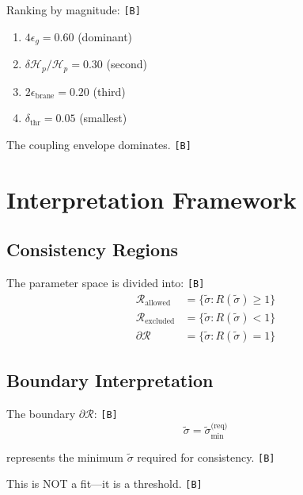 \documentclass[11pt,a4paper]{article}
\newcommand{\tagB}{\textcolor{purple!70!black}{\texttt{[B]}}}
\theoremstyle{definition}
\begin{document}
Ranking by magnitude: \tagB{}
\begin{enumerate}
  \item $4\epsilon_g = 0.60$ (dominant)
  \item $\delta\mathcal{H}_p/\mathcal{H}_p = 0.30$ (second)
  \item $2\epsilon_{\text{brane}} = 0.20$ (third)
  \item $\delta_{\text{thr}} = 0.05$ (smallest)
\end{enumerate}

The coupling envelope dominates. \tagB{}

\section{Interpretation Framework}
\label{sec:interpretation}

\subsection{Consistency Regions}
\label{subsec:regions}

The parameter space is divided into: \tagB{}
\begin{align}
\label{eq:region-allowed}
\mathcal{R}_{\text{allowed}} &= \{\tilde{\sigma} : R(\tilde{\sigma}) \geq 1\} \\
\label{eq:region-excluded}
\mathcal{R}_{\text{excluded}} &= \{\tilde{\sigma} : R(\tilde{\sigma}) < 1\} \\
\label{eq:region-marginal}
\partial\mathcal{R} &= \{\tilde{\sigma} : R(\tilde{\sigma}) = 1\}
\end{align}

\subsection{Boundary Interpretation}
\label{subsec:boundary}

The boundary $\partial\mathcal{R}$: \tagB{}
\begin{equation}
\label{eq:boundary-def}
\tilde{\sigma} = \tilde{\sigma}_{\min}^{\text{(req)}}
\end{equation}

represents the minimum $\tilde{\sigma}$ required for consistency. \tagB{}

This is NOT a fit---it is a threshold. \tagB{}
\end{document}

